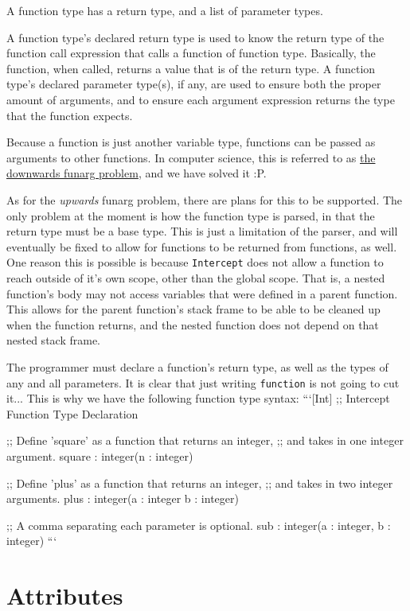 \documentclass[12pt]{report}
\begin{document}
A function type has a return type, and a list of parameter types.

A function type's declared return type is used to know the return type of the function call expression that calls a function of function type. Basically, the function, when called, returns a value that is of the return type.
A function type's declared parameter type(s), if any, are used to ensure both the proper amount of arguments, and to ensure each argument expression returns the type that the function expects.

Because a function is just another variable type, functions can be passed as arguments to other functions. In computer science, this is referred to as \href{https://en.wikipedia.org/wiki/Funarg_problem}{the downwards funarg problem}, and we have solved it :P.

As for the \emph{upwards} funarg problem, there are plans for this to be supported. The only problem at the moment is how the function type is parsed, in that the return type must be a base type. This is just a limitation of the parser, and will eventually be fixed to allow for functions to be returned from functions, as well. One reason this is possible is because \verb|Intercept| does not allow a function to reach outside of it's own scope, other than the global scope. That is, a nested function's body may not access variables that were defined in a parent function. This allows for the parent function's stack frame to be able to be cleaned up when the function returns, and the nested function does not depend on that nested stack frame.

The programmer must declare a function's return type, as well as the types of any and all parameters. It is clear that just writing \verb|function| is not going to cut it... This is why we have the following function type syntax:
```[Int]
;; Intercept Function Type Declaration

;; Define 'square' as a function that returns an integer,
;; and takes in one integer argument.
square : integer(n : integer)

;; Define 'plus' as a function that returns an integer,
;; and takes in two integer arguments.
plus : integer(a : integer b : integer)

;; A comma separating each parameter is optional.
sub : integer(a : integer, b : integer)
```

\section*{Attributes}
\label{sec:types-attributes}
\end{document}
